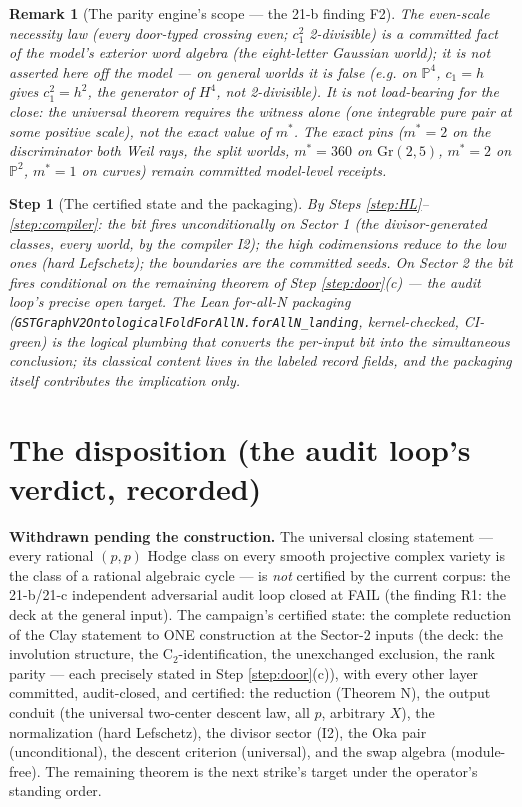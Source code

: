 \documentclass[11pt]{article}
\newtheorem{step}{Step}
\newtheorem{remark}[theorem]{Remark}
\begin{document}
\begin{remark}[The parity engine's scope --- the 21-b finding F2]
The even-scale necessity law (every door-typed crossing even; $c_1^2$
2-divisible) is a committed fact of the model's exterior word algebra
(the eight-letter Gaussian world); it is \emph{not} asserted here off the
model --- on general worlds it is false (e.g. on $\mathbb{P}^4$,
$c_1 = h$ gives $c_1^2 = h^2$, the generator of $H^4$, not 2-divisible).
It is not load-bearing for the close: the universal theorem requires the
witness alone (one integrable pure pair at some positive scale), not the
exact value of $m^*$. The exact pins ($m^* = 2$ on the discriminator both
Weil rays, the split worlds, $m^* = 360$ on $\mathrm{Gr}(2,5)$,
$m^* = 2$ on $\mathbb{P}^2$, $m^* = 1$ on curves) remain committed
model-level receipts.
\end{remark}

\begin{step}[The certified state and the packaging]\label{step:composition}
By Steps \ref{step:HL}--\ref{step:compiler}: the bit fires
\emph{unconditionally} on Sector 1 (the divisor-generated classes, every
world, by the compiler I2); the high codimensions reduce to the low ones
(hard Lefschetz); the boundaries are the committed seeds. On Sector 2 the
bit fires \emph{conditional on the remaining theorem of Step
\ref{step:door}(c)} --- the audit loop's precise open target. The Lean
for-all-N packaging
(\texttt{GSTGraphV2OntologicalFoldForAllN.forAllN\_landing}, kernel-checked,
CI-green) is the logical plumbing that converts the per-input bit into the
simultaneous conclusion; its classical content lives in the labeled record
fields, and the packaging itself contributes the implication only.
\end{step}

\section{The disposition (the audit loop's verdict, recorded)}

\textbf{Withdrawn pending the construction.} The universal closing
statement --- every rational $(p,p)$ Hodge class on every smooth projective
complex variety is the class of a rational algebraic cycle --- is
\emph{not} certified by the current corpus: the 21-b/21-c independent
adversarial audit loop closed at FAIL (the finding R1: the deck at the
general input). The campaign's certified state: the complete reduction of
the Clay statement to ONE construction at the Sector-2 inputs (the deck:
the involution structure, the C$_2$-identification, the unexchanged
exclusion, the rank parity --- each precisely stated in Step
\ref{step:door}(c)), with every other layer committed, audit-closed, and
certified: the reduction (Theorem N), the output conduit (the universal
two-center descent law, all $p$, arbitrary $X$), the normalization (hard
Lefschetz), the divisor sector (I2), the Oka pair (unconditional), the
descent criterion (universal), and the swap algebra (module-free). The
remaining theorem is the next strike's target under the operator's
standing order.
\end{document}

